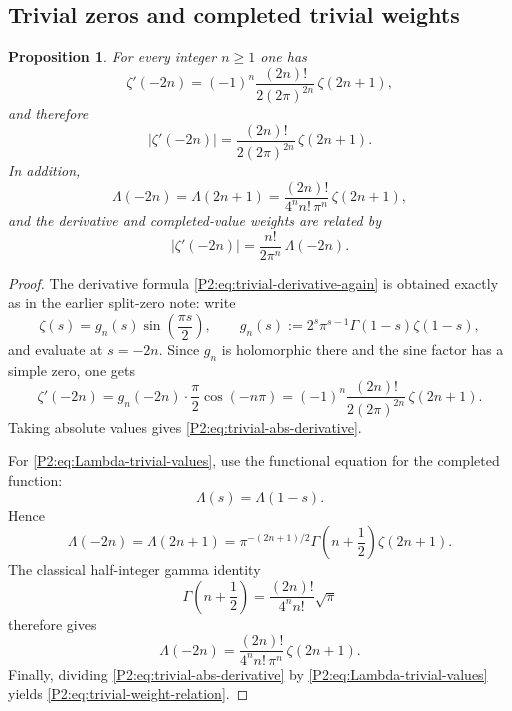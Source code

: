 \documentclass[11pt,a4paper]{article}
\numberwithin{equation}{section}
\newtheorem{proposition}[theorem]{Proposition}
\theoremstyle{definition}
\theoremstyle{remark}
\begin{document}
\subsection{Trivial zeros and completed trivial weights}

\begin{proposition}\label{P2:prop:trivial-derivative-and-Lambda}
For every integer $n\ge 1$ one has
\begin{equation}\label{P2:eq:trivial-derivative-again}
\zeta'(-2n)=(-1)^n\frac{(2n)!}{2(2\pi)^{2n}}\,\zeta(2n+1),
\end{equation}
and therefore
\begin{equation}\label{P2:eq:trivial-abs-derivative}
\bigl|\zeta'(-2n)\bigr|=\frac{(2n)!}{2(2\pi)^{2n}}\,\zeta(2n+1).
\end{equation}
In addition,
\begin{equation}\label{P2:eq:Lambda-trivial-values}
\Lambda(-2n)=\Lambda(2n+1)=\frac{(2n)!}{4^n n!\,\pi^n}\,\zeta(2n+1),
\end{equation}
and the derivative and completed-value weights are related by
\begin{equation}\label{P2:eq:trivial-weight-relation}
\bigl|\zeta'(-2n)\bigr|=\frac{n!}{2\pi^n}\,\Lambda(-2n).
\end{equation}
\end{proposition}

\begin{proof}
The derivative formula \eqref{P2:eq:trivial-derivative-again} is obtained exactly as in the earlier split-zero note: write
\[
\zeta(s)=g_n(s)\sin\!\left(\frac{\pi s}{2}\right),
\qquad
g_n(s):=2^s\pi^{s-1}\Gamma(1-s)\zeta(1-s),
\]
and evaluate at $s=-2n$.  Since $g_n$ is holomorphic there and the sine factor has a simple zero, one gets
\[
\zeta'(-2n)=g_n(-2n)\cdot \frac{\pi}{2}\cos(-n\pi)
=(-1)^n\frac{(2n)!}{2(2\pi)^{2n}}\,\zeta(2n+1).
\]
Taking absolute values gives \eqref{P2:eq:trivial-abs-derivative}.

For \eqref{P2:eq:Lambda-trivial-values}, use the functional equation for the completed function:
\[
\Lambda(s)=\Lambda(1-s).
\]
Hence
\[
\Lambda(-2n)=\Lambda(2n+1)=\pi^{-(2n+1)/2}\Gamma\!\left(n+\frac12\right)\zeta(2n+1).
\]
The classical half-integer gamma identity
\[
\Gamma\!\left(n+\frac12\right)=\frac{(2n)!}{4^n n!}\sqrt\pi
\]
therefore gives
\[
\Lambda(-2n)=\frac{(2n)!}{4^n n!\,\pi^n}\,\zeta(2n+1).
\]
Finally, dividing \eqref{P2:eq:trivial-abs-derivative} by \eqref{P2:eq:Lambda-trivial-values} yields \eqref{P2:eq:trivial-weight-relation}.
\end{proof}
\end{document}
